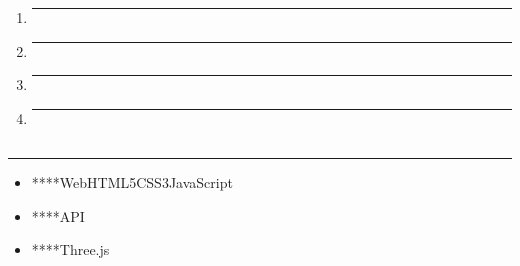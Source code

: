 \section{}\label{section}

\subsection{}\label{section-1}

\begin{enumerate}
\def\labelenumi{\arabic{enumi}.}
\item
  \begin{center}\rule{0.5\linewidth}{0.5pt}\end{center}
\item
  \begin{center}\rule{0.5\linewidth}{0.5pt}\end{center}
\item
  \begin{center}\rule{0.5\linewidth}{0.5pt}\end{center}
\item
  \begin{center}\rule{0.5\linewidth}{0.5pt}\end{center}
\end{enumerate}

\subsection{}\label{section-2}

\subsection{}\label{section-3}

\subsubsection{}\label{section-4}

\begin{center}\rule{0.5\linewidth}{0.5pt}\end{center}

\begin{itemize}
\tightlist
\item
  ****WebHTML5CSS3JavaScript
\item
  ****API
\item
  ****Three.js
\end{itemize}

